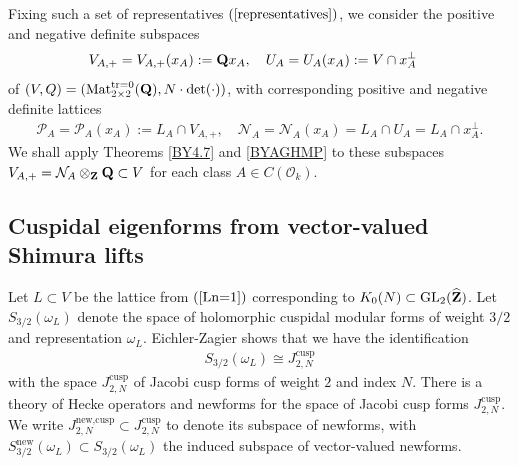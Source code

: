 \documentclass{amsart}
\theoremstyle{definition}
\theoremstyle{definition}
\theoremstyle{definition}
\begin{document}
Fixing such a set of representatives $(\ref{representatives})$, we consider the positive and negative definite subspaces 
\begin{align*} V_{A, +} = V_{A, +}(x_A) &:= {\bf{Q}} x_A, \quad U_A = U_A(x_A) := V \cap x_A^{\perp} \end{align*}
of $(V, Q) = (\operatorname{Mat}_{2 \times 2}^{\operatorname{tr=0}}({\bf{Q}}), N \cdot \det(\cdot))$, 
with corresponding positive and negative definite lattices 
\begin{align*} \mathcal{P} _A= \mathcal{P}_A(x_A) := L_A \cap V_{A, +}, 
\quad \mathcal{N}_A = \mathcal{N}_A(x_A)  = L_A \cap U_A = L_A \cap x_A^{\perp}. \end{align*}
We shall apply Theorems \ref{BY4.7} and \ref{BYAGHMP} to these subspaces 
$V_{A, +} = \mathcal{N}_A \otimes_{\bf{Z}} {\bf{Q}} \subset V$ for each class $A \in C(\mathcal{O}_k)$.

\subsection{Cuspidal eigenforms from vector-valued Shimura lifts} 
 
Let $L \subset V$ be the lattice from $(\ref{Ln=1})$ corresponding to $K_0(N) \subset \operatorname{GL}_2(\widehat{\bf{Z}})$. 
Let $S_{3/2}(\omega_L)$ denote the space of holomorphic cuspidal modular forms of weight $3/2$ 
and representation $\omega_L$. Eichler-Zagier \cite[Theorem 5.1]{EZ} shows that we have the identification 
\begin{align}\label{EZ} S_{3/2}(\omega_L) \cong J_{2, N}^{\operatorname{cusp}} \end{align} 
with the space $J_{2, N}^{\operatorname{cusp}}$ of Jacobi cusp forms of weight $2$ and index $N$. 
There is a theory of Hecke operators and newforms for the space of Jacobi cusp forms $J_{2, N}^{\operatorname{cusp}}$.
We write $J_{2, N}^{\operatorname{new, cusp}} \subset J_{2, N}^{\operatorname{cusp}}$ to denote its subspace of newforms,
with $S_{3/2}^{\operatorname{new}}(\omega_L) \subset S_{3/2}(\omega_L)$ the induced subspace of vector-valued newforms.
\end{document}

